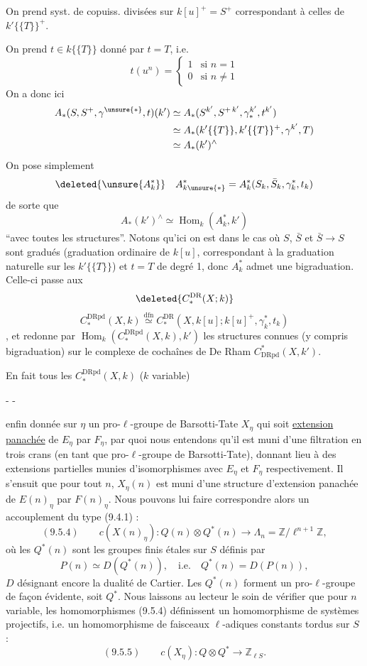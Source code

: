 On prend syst. de copuiss. divisées sur $k[u]^+=S^+$ correspondant à celles  de $k'\{\{T\}\}^+$.

On prend $t\in k\{\{T\}\}$ donné par $t=T$, i.e.
\[
 t(u^n)=\left\{\begin{array}{ll}1&\text{si }n=1\\0&\text{si }n\neq1\end{array}\right.
\]
On a donc ici
\[
\begin{aligned}
 A_*(S,S^+,\gamma^{\unsure{*}},t)(k')
 &\simeq A_*(S^{k'},S^{+\,k'},\gamma_*^{k'},t^{k'})\\
 &\simeq A_*(k'\{\{T\}\},k'\{\{T\}\}^+,\gamma^{k'},T)\\
 &\simeq A_*(k')^\wedge
\end{aligned}
\]
On pose simplement
\[
 \deleted{\unsure{A_k^*}}\quad A_{k\unsure{*}}^*=A_k^*(S_k,\bar S_k,\gamma_k^*,t_k)
\]
de sorte que
\[
 A_*(k')^\wedge\simeq\operatorname{Hom}_k(A_k^*,k')
\]
``avec toutes les structures''. Notons qu'ici on est dans le cas où $S$, $\bar S$ et $\bar S\longrightarrow S$ sont gradués (graduation ordinaire de $k[u]$, correspondant à la graduation naturelle sur les $k'\{\{T\}\}$) et $t=T$ de  degré 1, donc  $A_k^*$ admet une bigraduation. Celle-ci passe aux 
\[
 \deleted{C_*^{\mathrm{DR}}(X;k)}
\]
\[
 C_*^{\mathrm{DRpd}}(X,k)\overset{\mathrm{dfn}}\simeq C_*^{\mathrm{DR}}(X,k[u];k[u]^+,\gamma_k^*,t_k)
\]
, et redonne par $\operatorname{Hom}_k(C_*^{\mathrm{DRpd}}(X,k),k')$ les structures connues (y compris bigraduation) sur le complexe de cochaînes de De Rham $C^*_{\mathrm{DRpd}}(X,k')$.

En fait tous les $C_*^{\mathrm{DRpd}}(X,k)$ ($k$ variable)

\begin{center}-  -\end{center}

enfin donnée sur $\eta$ un pro-$\ell$-groupe de Barsotti-Tate $X_\eta$ qui soit \uline{extension panachée} de $E_\eta$ par $F_\eta$, par quoi nous entendons qu'il est muni d'une filtration en trois crans (en tant que pro-$\ell$-groupe de Barsotti-Tate), donnant lieu à des extensions partielles munies d'isomorphismes avec $E_\eta$ et $F_\eta$ respectivement. Il s'ensuit que pour tout $n$, $X_\eta(n)$ est muni d'une structure d'extension panachée de $E(n)_\eta$ par $F(n)_\eta$. Nous pouvons lui faire correspondre alors un accouplement du type (9.4.1) :
\[
(9.5.4)\qquad c(X(n)_\eta):Q(n)\otimes Q^*(n)\longrightarrow\Lambda_n=\mathbb Z/\ell^{n+1}\mathbb Z,
\]
où les $Q^*(n)$ sont les groupes finis étales sur $S$ définis par
\[
P(n)\simeq D(Q^*(n)),\quad\text{i.e.}\quad Q^*(n)=D(P(n)),
\]
$D$ désignant encore la dualité de Cartier. Les $Q^*(n)$ forment un pro-$\ell$-groupe de façon évidente, soit $Q^*$. Nous laissons au lecteur le soin de vérifier que pour $n$ variable, les homomorphismes (9.5.4) définissent un homomorphisme de systèmes projectifs, i.e. un homomorphisme de faisceaux $\ell$-adiques constants tordus sur $S$ :
\[
(9.5.5)\qquad c(X_\eta):Q\otimes Q^*\longrightarrow\mathbb Z_{\ell S}.
\]

